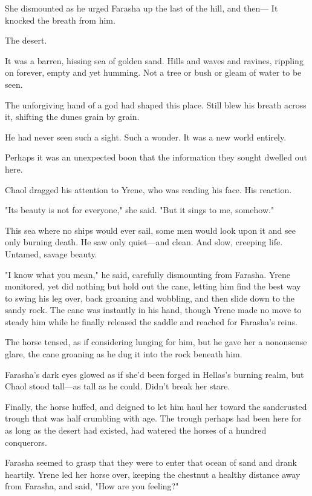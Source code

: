 She dismounted as he urged Farasha up the last of the hill, and then--- It knocked the breath from him.

The desert.

It was a barren, hissing sea of golden sand. Hills and waves and ravines, rippling on forever, empty and yet humming. Not a tree or bush or gleam of water to be seen.

The unforgiving hand of a god had shaped this place. Still blew his breath across it, shifting the dunes grain by grain.

He had never seen such a sight. Such a wonder. It was a new world entirely.

Perhaps it was an unexpected boon that the information they sought dwelled out here.

Chaol dragged his attention to Yrene, who was reading his face. His reaction.

"Its beauty is not for everyone," she said. "But it sings to me, somehow."

This sea where no ships would ever sail, some men would look upon it and see only burning death. He saw only quiet---and clean. And slow, creeping life. Untamed, savage beauty.

"I know what you mean," he said, carefully dismounting from Farasha. Yrene monitored, yet did nothing but hold out the cane, letting him find the best way to swing his leg over, back groaning and wobbling, and then slide down to the sandy rock. The cane was instantly in his hand, though Yrene made no move to steady him while he finally released the saddle and reached for Farasha's reins.

The horse tensed, as if considering lunging for him, but he gave her a nononsense glare, the cane groaning as he dug it into the rock beneath him.

Farasha's dark eyes glowed as if she'd been forged in Hellas's burning realm, but Chaol stood tall---as tall as he could. Didn't break her stare.

Finally, the horse huffed, and deigned to let him haul her toward the sandcrusted trough that was half crumbling with age. The trough perhaps had been here for as long as the desert had existed, had watered the horses of a hundred conquerors.

Farasha seemed to grasp that they were to enter that ocean of sand and drank heartily. Yrene led her horse over, keeping the chestnut a healthy distance away from Farasha, and said, "How are you feeling?"

